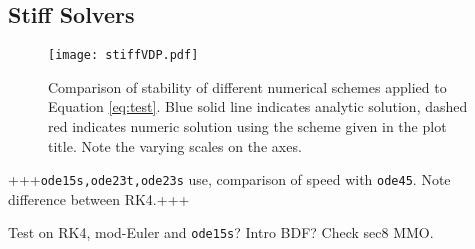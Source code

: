 \subsection{Stiff Solvers}
\begin{figure}
	\centering
	\texttt{[image: stiffVDP.pdf]}
	\caption[Stiff Solvers]{Comparison of stability of different numerical schemes applied to Equation \ref{eq:test}. Blue solid line indicates analytic solution, dashed red indicates numeric solution using the scheme given in the plot title. Note the varying scales on the axes.}
	
\end{figure}

+++\texttt{ode15s,ode23t,ode23s} use, comparison of speed with \texttt{ode45}. Note difference between RK4.+++



		Test on RK4, mod-Euler and \texttt{ode15s}? Intro BDF? Check sec8 MMO.


